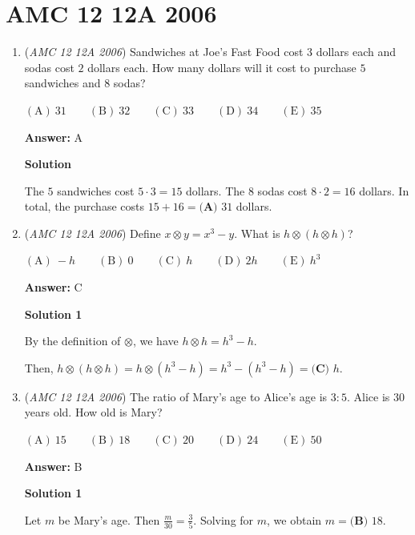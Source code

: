 \section{AMC 12 12A 2006}
        \begin{enumerate}
        	\item (\textit{AMC 12 12A 2006}) Sandwiches at Joe's Fast Food cost $3$ dollars each and sodas cost $2$ dollars each. How many dollars will it cost to purchase $5$ sandwiches and $8$ sodas?


 $\mathrm{(A) \ } 31\qquad \mathrm{(B) \ } 32\qquad \mathrm{(C) \ } 33\qquad \mathrm{(D) \ } 34\qquad \mathrm{(E) \ } 35$

 \textbf{Answer: }A



\textbf{Solution}

The $5$ sandwiches cost $5\cdot 3=15$ dollars. The $8$ sodas cost $8\cdot 2=16$ dollars. In total, the purchase costs $15+16=\boxed{\textbf{(A) }31}$ dollars.

 


	\item (\textit{AMC 12 12A 2006}) Define $x\otimes y=x^3-y$. What is $h\otimes (h\otimes h)$?


 $\mathrm{(A) \ } -h\qquad \mathrm{(B) \ } 0\qquad \mathrm{(C) \ } h\qquad \mathrm{(D) \ } 2h\qquad \mathrm{(E) \ }  h^3$

 \textbf{Answer: }C



\textbf{Solution 1}

By the definition of $\otimes$, we have $h\otimes h=h^{3}-h$. 

 Then, $h\otimes (h\otimes h)=h\otimes (h^{3}-h)=h^{3}-(h^{3}-h)=\boxed{\textbf{(C) }h}.$



	\item (\textit{AMC 12 12A 2006}) The ratio of Mary's age to Alice's age is $3:5$. Alice is $30$ years old. How old is Mary?


 $\mathrm{(A) \ } 15\qquad \mathrm{(B) \ } 18\qquad \mathrm{(C) \ } 20\qquad \mathrm{(D) \ } 24\qquad \mathrm{(E) \ }  50$

 \textbf{Answer: }B



\textbf{Solution 1}

Let $m$ be Mary's age. Then $\frac{m}{30}=\frac{3}{5}$. Solving for $m$, we obtain $m=\boxed{\textbf{(B) }18}.$





\end{enumerate}
